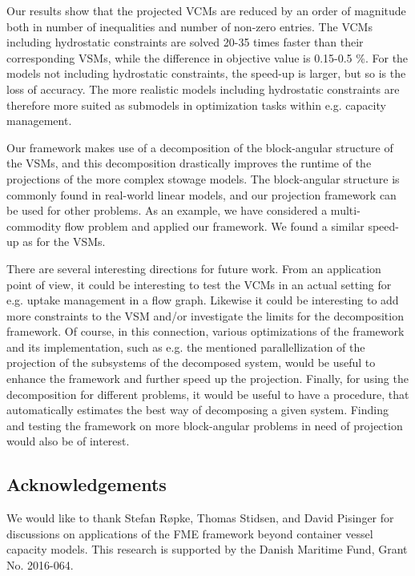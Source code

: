 Our results show that the projected VCMs are reduced by an order of magnitude both in number of inequalities and number of non-zero entries. The VCMs including hydrostatic constraints are solved 20-35 times faster than their corresponding VSMs, while the difference in objective value is 0.15-0.5 \%. For the models not including hydrostatic constraints, the speed-up is larger, but so is the loss of accuracy. The more realistic models including hydrostatic constraints are therefore more suited as submodels in optimization tasks within e.g. capacity management. 

Our framework makes use of a decomposition of the block-angular structure of the VSMs, and this decomposition drastically improves the runtime of the projections of the more complex stowage models. The block-angular structure is commonly found in real-world linear models, and our projection framework can be used for other problems. As an example, we have considered a multi-commodity flow problem and applied our framework. We found a similar speed-up as for the VSMs. 

There are several interesting directions for future work. 
From an application point of view, it could be interesting to test the VCMs in an actual setting for e.g. uptake management in a flow graph.
Likewise it could be interesting to  add more constraints to the VSM and/or investigate the limits for the decomposition framework. Of course, in this connection, various optimizations of the framework and its implementation, such as e.g. the mentioned parallellization of the projection of the subsystems of the decomposed system, would be useful to enhance the framework and further speed up the projection. Finally, for using the decomposition for different problems, it would be useful to have a procedure, that automatically estimates the best way of decomposing a given system. Finding and testing the framework on more block-angular problems in need of projection would also be of interest.

\subsection*{Acknowledgements}
We would like to thank Stefan R{\o}pke, Thomas Stidsen, and David Pisinger for discussions on applications of the FME framework beyond container vessel capacity models. This research is supported by the Danish Maritime Fund, Grant No. 2016-064.

{}



